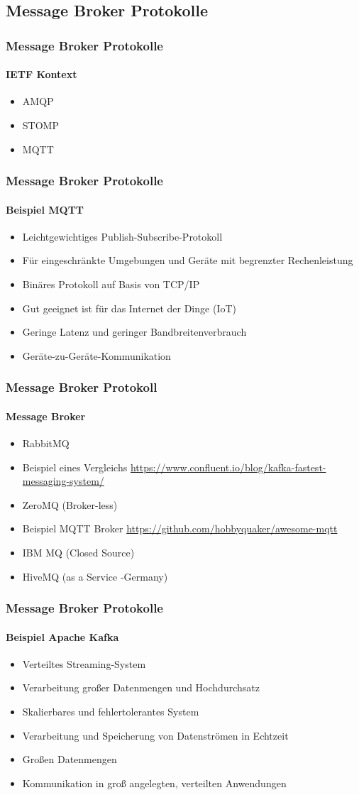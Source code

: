 \subsection{Message Broker Protokolle}
\begin{frame}
  \frametitle{Message Broker Protokolle}
  \framesubtitle{IETF Kontext}
  \begin{itemize}
    \item AMQP
    \item STOMP
    \item MQTT
  \end{itemize}
\end{frame}

\begin{frame}
  \frametitle{Message Broker Protokolle}
  \framesubtitle{Beispiel MQTT}
  \begin{itemize}
    \item Leichtgewichtiges Publish-Subscribe-Protokoll
    \item Für eingeschränkte Umgebungen und Geräte mit begrenzter Rechenleistung
    \item Binäres Protokoll auf Basis von TCP/IP
    \item Gut geeignet ist für das Internet der Dinge (IoT)
    \item Geringe Latenz und geringer Bandbreitenverbrauch
    \item Geräte-zu-Geräte-Kommunikation
  \end{itemize}
\end{frame}

\begin{frame}
  \frametitle{Message Broker Protokoll}
  \framesubtitle{Message Broker}
  \begin{itemize}
    \item RabbitMQ 
    \item Beispiel eines Vergleichs \url{https://www.confluent.io/blog/kafka-fastest-messaging-system/}
    \item ZeroMQ (Broker-less)
    \item Beispiel MQTT Broker \url{https://github.com/hobbyquaker/awesome-mqtt}
    \item IBM MQ (Closed Source)
    \item HiveMQ (as a Service -Germany)
    \end{itemize}
\end{frame}

\begin{frame}
  \frametitle{Message Broker Protokolle}
  \framesubtitle{Beispiel Apache Kafka}
  \begin{itemize}
    \item Verteiltes Streaming-System
    \item Verarbeitung großer Datenmengen und Hochdurchsatz
    \item Skalierbares und fehlertolerantes System
    \item Verarbeitung und Speicherung von Datenströmen in Echtzeit
    \item Großen Datenmengen
    \item Kommunikation in groß angelegten, verteilten Anwendungen
  \end{itemize}
\end{frame}

